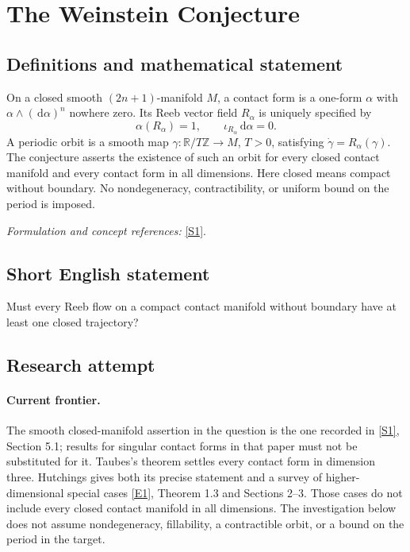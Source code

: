 \documentclass[11pt,a4paper]{article}
\newcommand{\Z}{\mathbb{Z}}
\newcommand{\R}{\mathbb{R}}
\newcommand{\dd}{\,\mathrm d}
\newcommand{\sref}[2]{\hyperlink{source:#1:#2}{[S#2]}}
\newcommand{\eref}[2]{\hyperlink{extra:#1:#2}{[E#2]}}
\newif\ifshowcatalogue
\newcommand{\cataloguescope}[1]{\ifshowcatalogue
 \paragraph{Exact scope in the supplied catalogue.}
 \begin{quote}\small #1\end{quote}\fi}
\numberwithin{equation}{section}
\begin{document}
\setcounter{section}{0}
\clearpage
\section*{\texorpdfstring{The Weinstein Conjecture}{The Weinstein Conjecture}}\label{1141}
\subsection{Definitions and mathematical statement}
On a closed smooth $(2n+1)$-manifold $M$, a contact form is a one-form $\alpha$ with $\alpha\wedge(\dd\alpha)^n$ nowhere zero. Its Reeb vector field $R_\alpha$ is uniquely specified by
\[
 \alpha(R_\alpha)=1,\qquad \iota_{R_\alpha}\dd\alpha=0.
\]
A periodic orbit is a smooth map $\gamma:\R/T\Z\to M$, $T>0$, satisfying $\dot\gamma=R_\alpha(\gamma)$. The conjecture asserts the existence of such an orbit for every closed contact manifold and every contact form in all dimensions. Here closed means compact without boundary. No nondegeneracy, contractibility, or uniform bound on the period is imposed.
\par\smallskip\textit{Formulation and concept references:} \sref{1141}{1}.
\cataloguescope{Prove that every closed contact manifold admits a periodic orbit of the Reeb flow of any contact form, in all dimensions.}
\subsection{Short English statement}
Must every Reeb flow on a compact contact manifold without boundary have at least one closed trajectory?
\subsection{Research attempt}

\paragraph{Current frontier.}
The smooth closed-manifold assertion in the question is the one recorded in
\sref{1141}{1}, Section 5.1; results for singular contact forms in that paper
must not be substituted for it. Taubes's theorem settles every contact form
in dimension three. Hutchings gives both its precise statement and a survey
of higher-dimensional special cases \eref{1141}{1}, Theorem 1.3 and
Sections 2--3. Those cases do not include every closed contact manifold in
all dimensions. The investigation below does not assume nondegeneracy,
fillability, a contractible orbit, or a bound on the period in the target.
\end{document}
